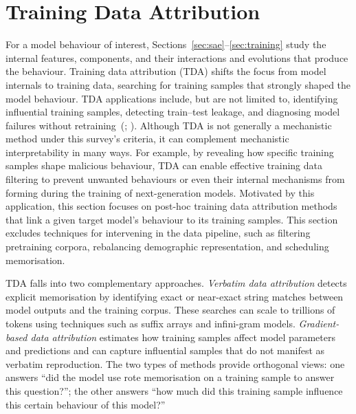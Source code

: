 \section{Training Data Attribution}
\label{sec:influence-functions}










For a model behaviour of interest, Sections~\ref{sec:sae}--\ref{sec:training} study the internal features, components, and their interactions and evolutions that produce the behaviour. Training data attribution (TDA) shifts the focus from model internals to training data, searching for training samples that strongly shaped the model behaviour. TDA applications include, but are not limited to, identifying influential training samples, detecting train--test leakage, and diagnosing model failures without retraining~(; ). Although TDA is not generally a mechanistic method under this survey’s criteria, it can complement mechanistic interpretability in many ways. For example, by revealing how specific training samples shape malicious behaviour, TDA can enable effective training data filtering to prevent unwanted behaviours or even their internal mechanisms from forming during the training of next-generation models. Motivated by this application, this section focuses on post-hoc training data attribution methods that link a given target model’s behaviour to its training samples. This section excludes techniques for intervening in the data pipeline, such as filtering pretraining corpora, rebalancing demographic representation, and scheduling memorisation.

TDA falls into two complementary approaches. \emph{Verbatim data attribution} detects explicit memorisation by identifying exact or near-exact string matches between model outputs and the training corpus. These searches can scale to trillions of tokens using techniques such as suffix arrays and infini-gram models. \emph{Gradient-based data attribution} estimates how training samples affect model parameters and predictions and can capture influential samples that do not manifest as verbatim reproduction. The two types of methods provide orthogonal views: one answers ``did the model use rote memorisation on a training sample to answer this question?''; the other answers ``how much did this training sample influence this certain behaviour of this model?''

